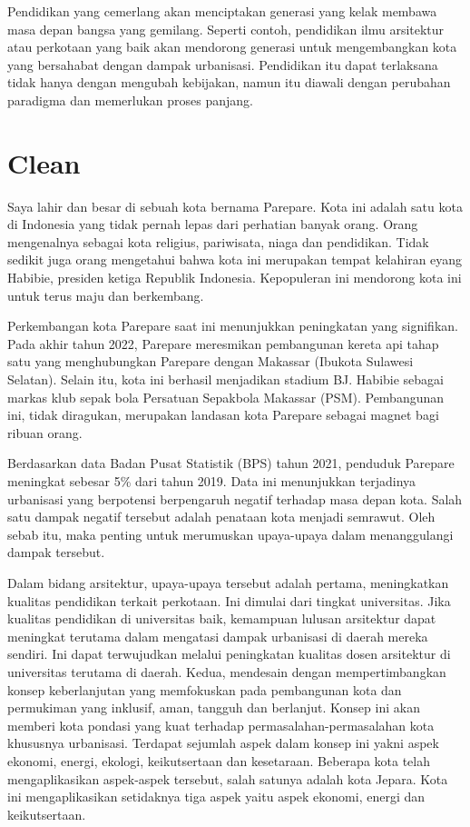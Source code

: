 \documentclass[../main.tex]{subfiles}
\begin{document}
Pendidikan yang cemerlang akan menciptakan generasi yang kelak membawa masa depan bangsa yang gemilang.
Seperti contoh, pendidikan ilmu arsitektur atau perkotaan yang baik akan mendorong generasi untuk mengembangkan kota yang bersahabat dengan dampak urbanisasi.
Pendidikan itu dapat terlaksana tidak hanya dengan mengubah kebijakan, namun itu diawali dengan perubahan paradigma dan memerlukan proses panjang.


\section{Clean}%

Saya lahir dan besar di sebuah kota  bernama Parepare. Kota ini adalah satu kota di Indonesia yang tidak pernah lepas dari perhatian banyak orang. Orang mengenalnya sebagai kota religius, pariwisata, niaga dan pendidikan. Tidak sedikit juga orang mengetahui bahwa kota ini merupakan tempat kelahiran eyang Habibie, presiden ketiga Republik Indonesia. Kepopuleran ini mendorong kota ini untuk terus maju dan berkembang.

Perkembangan kota Parepare saat ini menunjukkan peningkatan yang signifikan. Pada akhir tahun 2022, Parepare meresmikan pembangunan kereta api tahap satu yang menghubungkan Parepare dengan Makassar (Ibukota Sulawesi Selatan). Selain itu, kota ini berhasil menjadikan stadium BJ. Habibie sebagai markas klub sepak bola Persatuan Sepakbola Makassar (PSM). Pembangunan ini, tidak diragukan, merupakan landasan kota Parepare sebagai magnet bagi ribuan orang.

Berdasarkan data Badan Pusat Statistik (BPS) tahun 2021, penduduk Parepare meningkat sebesar 5\% dari tahun 2019.
Data ini menunjukkan terjadinya urbanisasi yang berpotensi berpengaruh negatif terhadap masa depan kota. Salah satu dampak negatif tersebut adalah penataan kota menjadi semrawut.
Oleh sebab itu, maka penting untuk merumuskan upaya-upaya dalam menanggulangi dampak tersebut.

Dalam bidang arsitektur, upaya-upaya tersebut adalah pertama, meningkatkan kualitas pendidikan terkait perkotaan. Ini dimulai dari tingkat universitas. Jika kualitas pendidikan di universitas baik,  kemampuan lulusan arsitektur dapat meningkat terutama dalam mengatasi dampak urbanisasi di daerah mereka sendiri. Ini dapat terwujudkan melalui peningkatan kualitas dosen arsitektur di universitas terutama di daerah. Kedua, mendesain dengan mempertimbangkan  konsep keberlanjutan yang memfokuskan pada pembangunan kota dan permukiman yang inklusif, aman, tangguh dan berlanjut. Konsep ini akan memberi kota pondasi yang kuat terhadap permasalahan-permasalahan kota khususnya urbanisasi. Terdapat sejumlah aspek dalam konsep ini yakni aspek ekonomi, energi, ekologi, keikutsertaan dan kesetaraan. Beberapa kota telah mengaplikasikan aspek-aspek tersebut, salah satunya adalah kota Jepara. Kota ini mengaplikasikan setidaknya tiga aspek yaitu aspek ekonomi, energi dan keikutsertaan.
\end{document}
